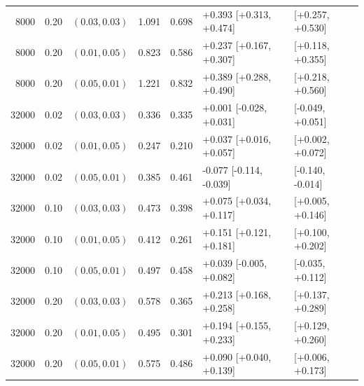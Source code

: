 \begin{table}[!htbp]
\begin{tabular}{@{}rrlrrll@{}}
8000 & 0.20 & $(0.03,0.03)$ & 1.091 & 0.698 & +0.393 [+0.313, +0.474] & [+0.257, +0.530] \\
8000 & 0.20 & $(0.01,0.05)$ & 0.823 & 0.586 & +0.237 [+0.167, +0.307] & [+0.118, +0.355] \\
8000 & 0.20 & $(0.05,0.01)$ & 1.221 & 0.832 & +0.389 [+0.288, +0.490] & [+0.218, +0.560] \\
32000 & 0.02 & $(0.03,0.03)$ & 0.336 & 0.335 & +0.001 [-0.028, +0.031] & [-0.049, +0.051] \\
32000 & 0.02 & $(0.01,0.05)$ & 0.247 & 0.210 & +0.037 [+0.016, +0.057] & [+0.002, +0.072] \\
32000 & 0.02 & $(0.05,0.01)$ & 0.385 & 0.461 & -0.077 [-0.114, -0.039] & [-0.140, -0.014] \\
32000 & 0.10 & $(0.03,0.03)$ & 0.473 & 0.398 & +0.075 [+0.034, +0.117] & [+0.005, +0.146] \\
32000 & 0.10 & $(0.01,0.05)$ & 0.412 & 0.261 & +0.151 [+0.121, +0.181] & [+0.100, +0.202] \\
32000 & 0.10 & $(0.05,0.01)$ & 0.497 & 0.458 & +0.039 [-0.005, +0.082] & [-0.035, +0.112] \\
32000 & 0.20 & $(0.03,0.03)$ & 0.578 & 0.365 & +0.213 [+0.168, +0.258] & [+0.137, +0.289] \\
32000 & 0.20 & $(0.01,0.05)$ & 0.495 & 0.301 & +0.194 [+0.155, +0.233] & [+0.129, +0.260] \\
32000 & 0.20 & $(0.05,0.01)$ & 0.575 & 0.486 & +0.090 [+0.040, +0.139] & [+0.006, +0.173] \\
\bottomrule
\end{tabular}
\end{table}
